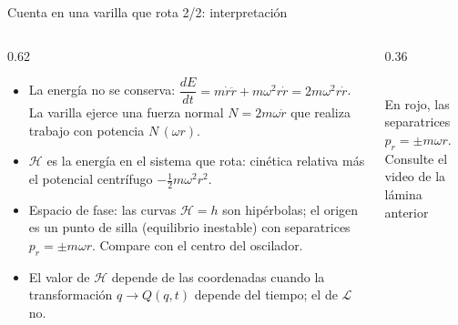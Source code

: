 \documentclass[spanish]{beamer}
\newcommand{\Lag}{\mathcal{L}}               %
\newcommand{\Ham}{\mathcal{H}}               %
\begin{document}
\begin{frame}{Cuenta en una varilla que rota 2/2: interpretación}
\begin{columns}[T]
\begin{column}{0.62\textwidth}
\begin{itemize}[<+->]
  \item La energía no se conserva:
        $\dfrac{dE}{dt}=m\dot r\ddot r+m\omega^2r\dot r=2m\omega^2r\dot r$.
        La varilla ejerce una fuerza normal $N=2m\omega\dot r$ que realiza trabajo
        con potencia $N\,(\omega r)$.
  \item $\Ham$ es la energía en el sistema que rota: cinética relativa más
        el potencial centrífugo $-\tfrac12 m\omega^2r^2$.
  \item Espacio de fase: las curvas $\Ham=h$ son hipérbolas; el origen es un
        punto de silla (equilibrio inestable) con separatrices $p_r=\pm m\omega r$.
        Compare con el centro del oscilador.
  \item El valor de $\Ham$ depende de las coordenadas cuando la transformación
        $q\to Q(q,t)$ depende del tiempo; el de $\Lag$ no.
\end{itemize}
\end{column}
\begin{column}{0.36\textwidth}
\centering
\\
{\tiny En rojo, las separatrices $p_r=\pm m\omega r$.} \\
{\tiny Consulte el video de la l\'amina anterior }
\end{column}
\end{columns}
\end{frame}
\end{document}
